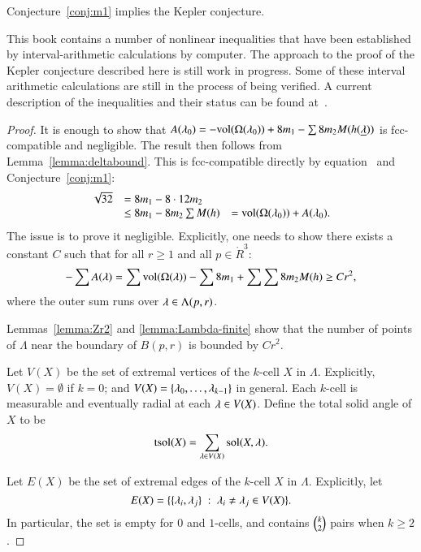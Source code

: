 \begin{theorem}\label{theorem:mk1}
Conjecture~\ref{conj:m1} implies the Kepler conjecture.
\end{theorem}

\begin{note}%
This book contains a number of nonlinear inequalities that have been established by interval-arithmetic calculations by computer.  The approach to the proof of the Kepler conjecture described here is still work in progress.  Some of these interval arithmetic calculations are still in the process of being verified.  A current description of the inequalities and their status can be found at~\cite{hales:2009:nonlinear}.
\end{note}

\begin{proof} 
It is enough to show that $A(\lambda_0)  = -{\operatorname{vol}}(\Omega(\lambda_0)) + 8 m_1 - \sum 8 m_2 M(h({\underline{\lambda}}))$ is fcc-compatible and negligible.  The
result then follows from Lemma~\ref{lemma:deltabound}.  
This is fcc-compatible directly
by equation~
and Conjecture~\ref{conj:m1}:
$$
\begin{array}{lll}
\sqrt{32} &= 8 m_1 - 8\cdot 12 m_2\\
  &\le 8 m_1 - 8 m_2 \sum M(h)
  &= {\operatorname{vol}}(\Omega(\lambda_0)) + A(\lambda_0).
\end{array}
$$  
The issue is to prove it negligible.  Explicitly, one needs
to show there exists a constant  $C$ such that for all $r\ge 1$ and all $p\in\ring{R}^3$:
\begin{equation}\label{eqn:neg}
  -\sum A(\lambda) = \sum {\operatorname{vol}}(\Omega(\lambda)) -\sum 8m_1 + \sum \sum 8 m_2 M(h) \ge C r^2,
\end{equation}
where the outer sum runs over $\lambda\in \Lambda(p,r)$.

Lemmas~\ref{lemma:Zr2} and \ref{lemma:Lambda-finite}  show that the number of points of $\Lambda$ near the boundary of $B(p,r)$ is bounded by $C r^2$.

Let $V(X)$ be the set of extremal vertices of the $k$-cell $X$ in $\Lambda$.  Explicitly, $V(X)=\emptyset$ if $k=0$; and $V(X) = \{\lambda_0,\ldots,\lambda_{k-1}\}$ in general.  Each $k$-cell is measurable and eventually
radial at each $\lambda\in V(X)$.  Define the total solid angle of $X$ to be
$$
{\operatorname{tsol}}(X) = \sum_{\lambda\in V(X)} \operatorname{sol}(X,\lambda).
$$

Let $E(X)$ be the set of extremal edges of the $k$-cell $X$ in $\Lambda$.  Explicitly, let 
$$E(X)=\{\{\lambda_i,\lambda_j\}\ :\  \lambda_i\ne\lambda_j\in V(X)\}.$$
In particular, the set is empty for $0$ and $1$-cells, and contains
$\tbinom{k}{2}$ pairs when $k\ge 2$.



\end{proof}
